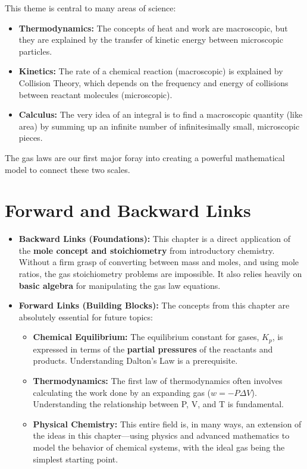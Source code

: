 \documentclass{article}
\begin{document}
This theme is central to many areas of science:
\begin{itemize}
    \item \textbf{Thermodynamics:} The concepts of heat and work are macroscopic, but they are explained by the transfer of kinetic energy between microscopic particles.
    \item \textbf{Kinetics:} The rate of a chemical reaction (macroscopic) is explained by Collision Theory, which depends on the frequency and energy of collisions between reactant molecules (microscopic).
    \item \textbf{Calculus:} The very idea of an integral is to find a macroscopic quantity (like area) by summing up an infinite number of infinitesimally small, microscopic pieces.
\end{itemize}
The gas laws are our first major foray into creating a powerful mathematical model to connect these two scales.

\section{Forward and Backward Links}
\begin{itemize}
    \item \textbf{Backward Links (Foundations):} This chapter is a direct application of the \textbf{mole concept and stoichiometry} from introductory chemistry. Without a firm grasp of converting between mass and moles, and using mole ratios, the gas stoichiometry problems are impossible. It also relies heavily on \textbf{basic algebra} for manipulating the gas law equations.

    \item \textbf{Forward Links (Building Blocks):} The concepts from this chapter are absolutely essential for future topics:
        \begin{itemize}
            \item \textbf{Chemical Equilibrium:} The equilibrium constant for gases, $K_p$, is expressed in terms of the \textbf{partial pressures} of the reactants and products. Understanding Dalton's Law is a prerequisite.
            \item \textbf{Thermodynamics:} The first law of thermodynamics often involves calculating the work done by an expanding gas ($w = -P\Delta V$). Understanding the relationship between P, V, and T is fundamental.
            \item \textbf{Physical Chemistry:} This entire field is, in many ways, an extension of the ideas in this chapter—using physics and advanced mathematics to model the behavior of chemical systems, with the ideal gas being the simplest starting point.
        \end{itemize}
\end{itemize}
\end{document}
